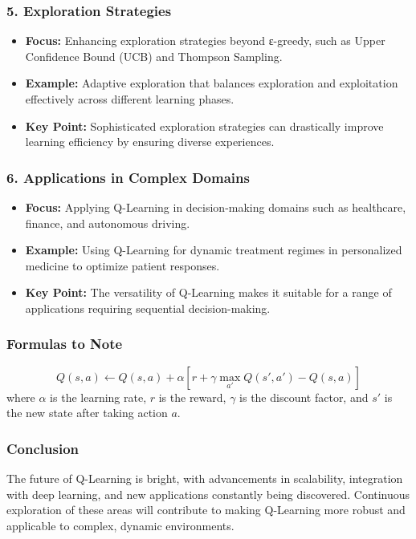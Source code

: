\documentclass[aspectratio=169]{beamer}
\begin{document}
\begin{frame}[fragile]
    \frametitle{5. Exploration Strategies}
    \begin{itemize}
        \item \textbf{Focus:} Enhancing exploration strategies beyond ε-greedy, such as Upper Confidence Bound (UCB) and Thompson Sampling.
        \item \textbf{Example:} Adaptive exploration that balances exploration and exploitation effectively across different learning phases.
        \item \textbf{Key Point:} Sophisticated exploration strategies can drastically improve learning efficiency by ensuring diverse experiences.
    \end{itemize}
\end{frame}

\begin{frame}[fragile]
    \frametitle{6. Applications in Complex Domains}
    \begin{itemize}
        \item \textbf{Focus:} Applying Q-Learning in decision-making domains such as healthcare, finance, and autonomous driving.
        \item \textbf{Example:} Using Q-Learning for dynamic treatment regimes in personalized medicine to optimize patient responses.
        \item \textbf{Key Point:} The versatility of Q-Learning makes it suitable for a range of applications requiring sequential decision-making.
    \end{itemize}
\end{frame}

\begin{frame}[fragile]
    \frametitle{Formulas to Note}
    \begin{equation}
        Q(s, a) \leftarrow Q(s, a) + \alpha \left[ r + \gamma \max_{a'} Q(s', a') - Q(s, a) \right]
    \end{equation}
    where \( \alpha \) is the learning rate, \( r \) is the reward, \( \gamma \) is the discount factor, and \( s' \) is the new state after taking action \( a \).
\end{frame}

\begin{frame}[fragile]
    \frametitle{Conclusion}
    The future of Q-Learning is bright, with advancements in scalability, integration with deep learning, and new applications constantly being discovered. Continuous exploration of these areas will contribute to making Q-Learning more robust and applicable to complex, dynamic environments.
\end{frame}
\end{document}

